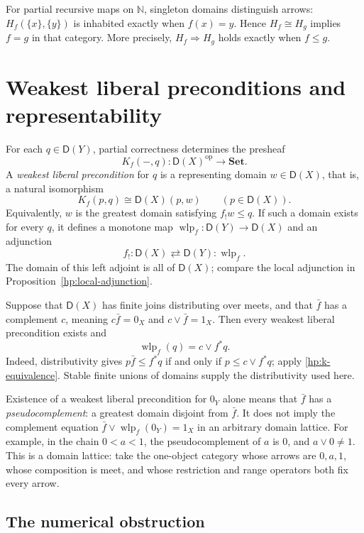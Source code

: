 \documentclass[11pt]{article}
\theoremstyle{definition}
\theoremstyle{remark}
\newcommand{\D}{\mathsf D}
\newcommand{\Set}{\mathbf{Set}}
\newcommand{\N}{\mathbb N}
\newcommand{\op}{\mathrm{op}}
\begin{document}
For partial recursive maps on $\N$, singleton domains distinguish arrows: $H_f(\{x\},\{y\})$ is inhabited exactly when
$f(x)=y$. Hence $H_f\cong H_g$ implies $f=g$ in that category.
More precisely, $H_f\Rightarrow H_g$ holds exactly when $f\le g$.

\section{Weakest liberal preconditions and representability}
\label{hp:representability}

For each $q\in\D(Y)$, partial correctness determines the presheaf
\[
 K_f(-,q):\D(X)^{\op}\longrightarrow\Set.
\]
A \emph{weakest liberal precondition} for $q$ is a representing domain
$w\in\D(X)$, that is, a natural isomorphism
\begin{equation}\label{hp:wlp-representing}
 K_f(p,q)\cong\D(X)(p,w)
 \qquad(p\in\D(X)).
\end{equation}
Equivalently, $w$ is the greatest domain satisfying $f_!w\le q$.
If such a domain exists for every $q$, it defines a monotone map
$\operatorname{wlp}_f:\D(Y)\to\D(X)$ and an adjunction
\[
 f_!:\D(X)\rightleftarrows\D(Y):\operatorname{wlp}_f.
\]
The domain of this left adjoint is all of $\D(X)$; compare the local
adjunction in Proposition~\ref{hp:local-adjunction}.

Suppose that $\D(X)$ has finite joins distributing over meets, and that
$\bar f$ has a complement $c$, meaning $c\bar f=0_X$ and
$c\vee\bar f=1_X$. Then every weakest liberal precondition exists and
\begin{equation}\label{hp:complemented-wlp}
 \operatorname{wlp}_f(q)=c\vee f^*q.
\end{equation}
Indeed, distributivity gives
$p\bar f\le f^*q$ if and only if $p\le c\vee f^*q$; apply
\eqref{hp:k-equivalence}. Stable finite unions of domains supply the
distributivity used here.

Existence of a weakest liberal precondition for $0_Y$ alone means that
$\bar f$ has a \emph{pseudocomplement}: a greatest domain disjoint from
$\bar f$. It does not imply the complement equation
$\bar f\vee\operatorname{wlp}_f(0_Y)=1_X$ in an arbitrary domain
lattice. For example, in the chain $0<a<1$, the pseudocomplement of
$a$ is $0$, and $a\vee0\ne1$. This is a domain lattice: take the
one-object category whose arrows are $0,a,1$, whose composition is meet,
and whose restriction and range operators both fix every arrow.

\subsection{The numerical obstruction}
\end{document}
